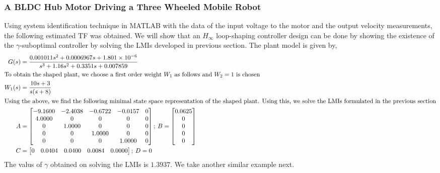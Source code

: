 \documentclass[a4paper,12pt]{article}
\begin{document}
	 		\subsubsection{A BLDC Hub Motor Driving a Three Wheeled Mobile Robot}
	 	Using system identification technique in MATLAB with the data of the input voltage to the motor and the output velocity measurements, the following estimated TF was obtained. We will show that an $H_{\infty}$ loop-shaping controller design can be done by showing the existence of the $\gamma$-suboptimal controller by solving the LMIs developed in previous section.
	 	The plant model is given by,
	 	\begin{align}
	 	G(s)&= \frac{0.001011s^{2} + 0.0006967{s} + 1.801 \times 10^{-6}}{s^{3} + 1.16 s^{2} + 0.3351s + 0.007859}\\
	 	\intertext{To obtain the shaped plant, we choose a first order weight $W_{1}$ as follows and $W_{2}=1$ is chosen}
	 	W_{1}(s) &= \frac{10s + 3}{s(s + 8)}\\
	 	\intertext{Using the above, we find the following  minimal state space representation of the shaped plant. Using this, we solve the LMIs formulated in the previous section}
	 	A& =\begin{bmatrix}
  -9.1600  & -2.4038 &  -0.6722  & -0.0157        & 0\\
    4.0000    &     0     &    0       &  0        & 0 \\
         0   & 1.0000    &     0       &  0        & 0 \\
        0    &     0   & 1.0000       &  0        & 0 \\
       0     &    0        & 0   & 1.0000        & 0 \\
\end{bmatrix} ; \:
B =
\begin{bmatrix}
    0.0625\\
         0\\
         0\\
         0\\
         0\\
\end{bmatrix}\\
C &= \begin{bmatrix}
         0    & 0.0404 &    0.0400 &   0.0084  &  0.0000
\end{bmatrix}; \:
D = 0
	 	\end{align}
	 The valus of $\gamma$ obtained on solving the LMIs is $1.3937$. We take another similar example next.
\end{document}
